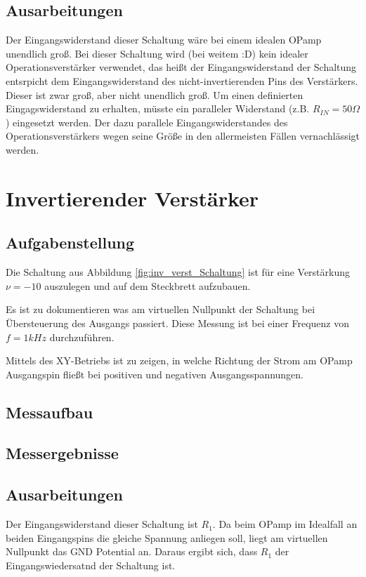\subsection{Ausarbeitungen}
Der Eingangswiderstand dieser Schaltung wäre bei einem idealen OPamp unendlich groß. Bei dieser Schaltung wird (bei weitem :D) kein idealer Operationsverstärker verwendet, das heißt der Eingangswiderstand der Schaltung entsrpicht dem Eingangswiderstand des nicht-invertierenden Pins des Verstärkers. Dieser ist zwar groß, aber nicht unendlich groß. Um einen definierten Eingagswiderstand zu erhalten, müsste ein paralleler Widerstand (z.B. $R_{IN}=50\Omega$) eingesetzt werden. Der dazu parallele Eingangswiderstandes des Operationsverstärkers wegen seine Größe in den allermeisten Fällen vernachlässigt werden.

\section{Invertierender Verstärker}
\subsection{Aufgabenstellung}
Die Schaltung aus Abbildung \ref{fig:inv_verst_Schaltung} ist für eine Verstärkung $\nu = -10$ auszulegen und auf dem Steckbrett aufzubauen. 

Es ist zu dokumentieren was am virtuellen Nullpunkt der Schaltung bei Übersteuerung des Ausgangs passiert. Diese Messung ist bei einer Frequenz von $f=1kHz$ durchzuführen. 

Mittels des XY-Betriebs ist zu zeigen, in welche Richtung der Strom am OPamp Ausgangspin fließt bei positiven und negativen Ausgangsspannungen. 

\subsection{Messaufbau}


\subsection{Messergebnisse}

\subsection{Ausarbeitungen}
Der Eingangswiderstand dieser Schaltung ist $R_1$. Da beim OPamp im Idealfall an beiden Eingangspins die gleiche Spannung anliegen soll, liegt am virtuellen Nullpunkt das GND Potential an. Daraus ergibt sich, dass $R_1$ der Eingangswiedersatnd der Schaltung ist.



